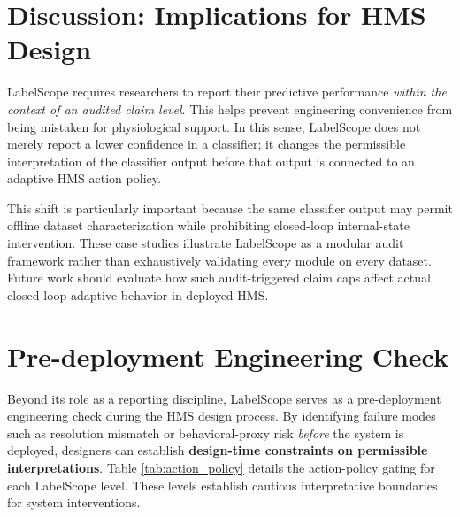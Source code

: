 \documentclass[journal]{IEEEtran}
\begin{document}
\FloatBarrier
\section{Discussion: Implications for HMS Design}
\label{sec:discussion}

LabelScope requires researchers to report their predictive performance \textit{within the context of an audited claim level}. This helps prevent engineering convenience from being mistaken for physiological support. In this sense, LabelScope does not merely report a lower confidence in a classifier; it changes the permissible interpretation of the classifier output before that output is connected to an adaptive HMS action policy. 

This shift is particularly important because the same classifier output may permit offline dataset characterization while prohibiting closed-loop internal-state intervention. These case studies illustrate LabelScope as a modular audit framework rather than exhaustively validating every module on every dataset. Future work should evaluate how such audit-triggered claim caps affect actual closed-loop adaptive behavior in deployed HMS.

\FloatBarrier
\section{Pre-deployment Engineering Check}

Beyond its role as a reporting discipline, LabelScope serves as a pre-deployment engineering check during the HMS design process. By identifying failure modes such as resolution mismatch or behavioral-proxy risk \textit{before} the system is deployed, designers can establish \textbf{design-time constraints on permissible interpretations}. Table \ref{tab:action_policy} details the action-policy gating for each LabelScope level. These levels establish cautious interpretative boundaries for system interventions.
\end{document}
